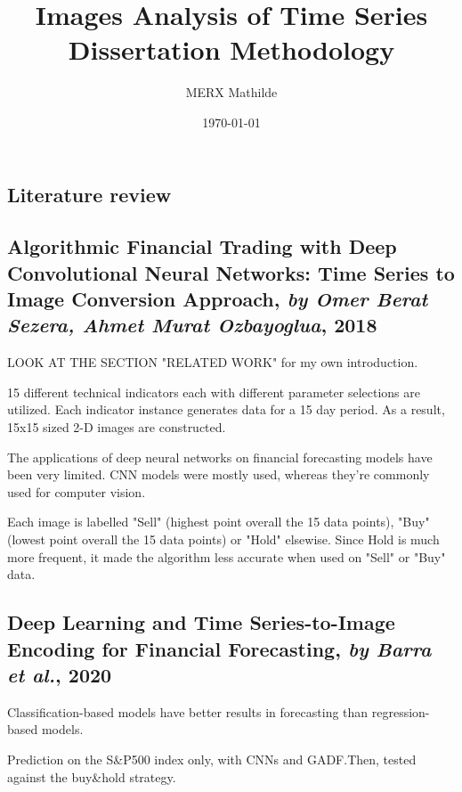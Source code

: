 \documentclass[11pt]{article}
\begin{document}
\begin{onehalfspace}


\title{%
Images Analysis of Time Series\\
\large Dissertation Methodology}
\date{{\today}}
\author{MERX Mathilde}

\maketitle 

\tableofcontents


\pagebreak

\section{Literature review}

\subsection{Algorithmic Financial Trading with Deep Convolutional Neural Networks: Time Series to Image Conversion Approach, \textit{by Omer Berat Sezera, Ahmet Murat Ozbayoglua}, 2018}

LOOK AT THE SECTION "RELATED WORK" for my own introduction.

15 diﬀerent technical indicators each with diﬀerent parameter selections are utilized. Each indicator instance generates data for a 15 day period. As a result, 15x15 sized 2-D images are constructed. 

The applications of deep neural networks on ﬁnancial forecasting models have been very limited. CNN models were mostly used, whereas they're commonly used for computer vision.

Each image is labelled "Sell" (highest point overall the 15 data points), "Buy" (lowest point overall the 15 data points) or "Hold" elsewise. Since Hold is much more frequent, it made the algorithm less accurate when used on "Sell" or "Buy" data. 

\subsection{Deep Learning and Time Series-to-Image Encoding for Financial Forecasting, \textit{by Barra et al.}, 2020}

Classification-based models have better results in forecasting than regression-based models.

Prediction on the S\&P500 index only, with CNNs and GADF.Then, tested against the buy\&hold strategy. 


\end{onehalfspace}
\end{document}
